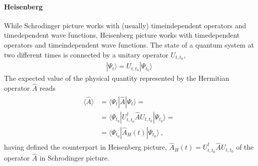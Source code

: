 \documentclass[letterpaper,10pt,english]{jupyterBook}
\begin{document}
\paragraph{Heisenberg}
\label{\detokenize{ch/quantum-mechanics/intro:heisenberg}}\label{\detokenize{ch/quantum-mechanics/intro:quantum-mechanics-intro-non-relativistic-schrodinger-equation-pictures-heisenberg}}
\sphinxAtStartPar
While Schrodinger picture works with (usually) time\sphinxhyphen{}independent operators and time\sphinxhyphen{}dependent wave functions, Heisenberg picture works with time\sphinxhyphen{}dependent operators and time\sphinxhyphen{}independent wave functions. The state of a quantum system at two different times is connected by a unitary operator \(U_{t,t_0}\),
\begin{equation*}
\begin{split}| \Psi_t \rangle = U_{t,t_0} | \Psi_{t_0} \rangle\end{split}
\end{equation*}
\sphinxAtStartPar
{} The expected value of the physical quantity represented by the Hermitian operator \(\hat{A}\) reads
\begin{equation*}
\begin{split}\begin{aligned}
 \langle \hat{A} \rangle 
 & = \langle \Psi_t | \hat{A} | \Psi_t \rangle = \\
 & = \langle \Psi_{t_0} | U^{\dagger}_{t,t_0} \hat{A} U_{t,t_0} | \Psi_{t_0} \rangle = \\
 & = \langle \Psi_{t_0} | \hat{A}_H(t) | \Psi_{t_0} \rangle \ ,
\end{aligned}\end{split}
\end{equation*}
\sphinxAtStartPar
having defined the counterpart in Heisenberg picture, \(\hat{A}_H(t) = U^{\dagger}_{t,t_0} \hat{A} U_{t,t_0}\) of the operator \(\hat{A}\) in Schrodinger picture.
\end{document}
